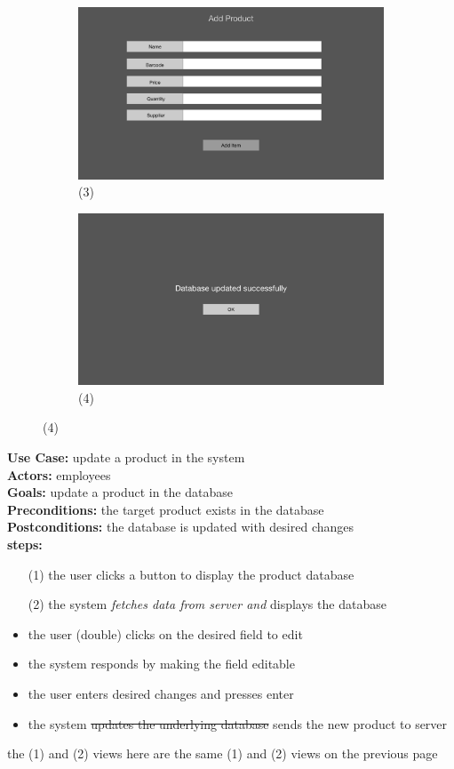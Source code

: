 \documentclass[notitlepage,11pt]{article}
\begin{document}
\begin{figure}[h]
	\begin{subfigure}{.5\textwidth}
	\centering
	\includegraphics[scale=0.12]{ProdInfo}
	\caption{(3)}
	\end{subfigure}%
	\begin{subfigure}{.5\textwidth}
	\centering
	\includegraphics[scale=0.12]{Success}
	\caption{(4)}
	\end{subfigure}
\end{figure}
\newpage
\textbf{Use Case:} update a product in the system\\
\textbf{Actors:} employees\\
\textbf{Goals:} update a product in the database\\
\textbf{Preconditions:} the target product exists in the database\\
\textbf{Postconditions:} the database is updated with desired changes\\
\textbf{steps:}
	\begin{itemize}
		\item[(1)] the user clicks a button to display the product database
		\item[(2)] the system \emph{fetches data from server and} displays the database
		\item the user (double) clicks on the desired field to edit
		\item the system responds by making the field editable
		\item the user enters desired changes and presses enter
		\item the system \sout{updates the underlying database} sends the new product to server
	\end{itemize}
the (1) and (2) views here are the same (1) and (2) views on the previous page
\end{document}
